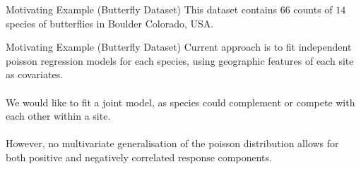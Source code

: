 \documentclass[9pt,notes=hide]{beamer}
\begin{document}
\begin{frame}{Motivating Example (Butterfly Dataset)}
	This dataset contains $66$  counts of  $14$ species of butterflies in
	Boulder Colorado, USA. \\
	\begin{table}
		\centering
		\caption{Snippet of Butterfly Counts for the $3$ most common species \parencite{Hui2013, 2006Oliver}}
	\end{table}
\end{frame}




\begin{frame}{Motivating Example (Butterfly Dataset)}
	Current approach is to fit independent poisson regression models for each
	species,  using geographic features of each site as covariates.\\
	\pause
	\vspace{0.1cm}\\
	We would like to fit a joint model, as species could complement or compete
	with each other within a site. \\
	\pause
	\vspace{0.1cm}\\
	However, no multivariate generalisation of the poisson distribution allows
	for both positive and negatively correlated response components.
\end{frame}
\end{document}
